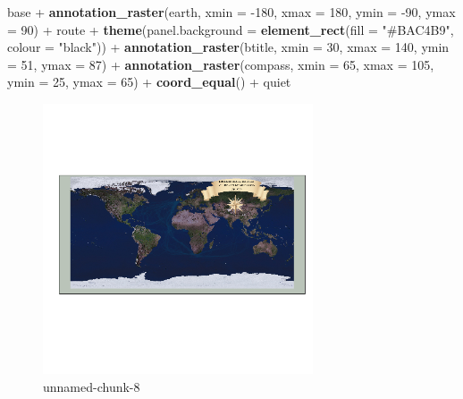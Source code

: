 \documentclass[]{article}
\newenvironment{Shaded}{}{}
\newcommand{\KeywordTok}[1]{\textcolor[rgb]{0.00,0.44,0.13}{\textbf{{#1}}}}
\newcommand{\DataTypeTok}[1]{\textcolor[rgb]{0.56,0.13,0.00}{{#1}}}
\newcommand{\DecValTok}[1]{\textcolor[rgb]{0.25,0.63,0.44}{{#1}}}
\newcommand{\StringTok}[1]{\textcolor[rgb]{0.25,0.44,0.63}{{#1}}}
\newcommand{\NormalTok}[1]{{#1}}
\let\Oldincludegraphics\includegraphics
\renewcommand{\includegraphics}[1]{\Oldincludegraphics[width=8cm]{#1}}
\begin{document}
\begin{Shaded}
\begin{Highlighting}[]
\NormalTok{base + }\KeywordTok{annotation_raster}\NormalTok{(earth, }\DataTypeTok{xmin =} \NormalTok{-}\DecValTok{180}\NormalTok{, }\DataTypeTok{xmax =} \DecValTok{180}\NormalTok{, }\DataTypeTok{ymin =} \NormalTok{-}\DecValTok{90}\NormalTok{, }\DataTypeTok{ymax =} \DecValTok{90}\NormalTok{) + }
    \NormalTok{route + }\KeywordTok{theme}\NormalTok{(}\DataTypeTok{panel.background =} \KeywordTok{element_rect}\NormalTok{(}\DataTypeTok{fill =} \StringTok{"#BAC4B9"}\NormalTok{, }\DataTypeTok{colour =} \StringTok{"black"}\NormalTok{)) + }
    \KeywordTok{annotation_raster}\NormalTok{(btitle, }\DataTypeTok{xmin =} \DecValTok{30}\NormalTok{, }\DataTypeTok{xmax =} \DecValTok{140}\NormalTok{, }\DataTypeTok{ymin =} \DecValTok{51}\NormalTok{, }\DataTypeTok{ymax =} \DecValTok{87}\NormalTok{) + }
    \KeywordTok{annotation_raster}\NormalTok{(compass, }\DataTypeTok{xmin =} \DecValTok{65}\NormalTok{, }\DataTypeTok{xmax =} \DecValTok{105}\NormalTok{, }\DataTypeTok{ymin =} \DecValTok{25}\NormalTok{, }\DataTypeTok{ymax =} \DecValTok{65}\NormalTok{) + }
    \KeywordTok{coord_equal}\NormalTok{() + quiet}
\end{Highlighting}
\end{Shaded}
\begin{figure}[htbp]
\centering
\includegraphics{figure/unnamed-chunk-8.png}
\caption{unnamed-chunk-8}
\end{figure}
\end{document}
